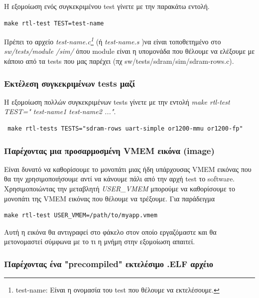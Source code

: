\documentclass[a4paper,10pt]{article}
\numberwithin{figure}{section}
\numberwithin{table}{section}
\begin{document}
Η εξομοίωση ενός συγκεκριμένου test γίνετε με την παρακάτω εντολή.
\vspace{0.7cm}
\begin{lstlisting}
make rtl-test TEST=test-name
\end{lstlisting}
\vspace{0.7cm}
Πρέπει το αρχείο \emph{test-name.c\footnote{test-name: Είναι η ονομασία του test που θέλουμε να εκτελέσουμε.}}
 (ή \emph{test-name.s} )να είναι τοποθετημένο στο \emph{sw/tests/module /sim/ } όπου module είναι η υπομονάδα που θέλουμε να ελέξουμε με κάποιο από τα tests που μας παρέχει 
(πχ sw/tests/sdram/sim/sdram-rows.c).


\subsubsection{Εκτέλεση συγκεκριμένων tests μαζί}


Η εξομοίωση πολλών συγκεκριμένων tests γίνετε με την εντολή \emph{make rtl-test TEST=" test-name1 test-name2 ..."}.
\vspace{0.7cm}
\begin{lstlisting}
 make rtl-tests TESTS="sdram-rows uart-simple or1200-mmu or1200-fp"
\end{lstlisting}
\vspace{0.7cm}


\subsubsection{ Παρέχοντας μια προσαρμοσμένη VMEM εικόνα (image)}


Είναι δυνατό να καθορίσουμε το μονοπάτι μιας ήδη υπάρχουσας VMEM εικόνας που θα την
χρησιμοποιήσουμε αντί να κάνουμε πάλι από την αρχή test το software. Χρησιμοποιώντας
την μεταβλητή \emph{USER\_VMEM} μπορούμε να καθορίσουμε το μονοπάτι της VMEM εικόνας
που θέλουμε να τρέξουμε. Για παράδειγμα 
\vspace{0.7cm}
\begin{lstlisting}
make rtl-test USER_VMEM=/path/to/myapp.vmem
\end{lstlisting}
\vspace{0.7cm}
Αυτή η εικόνα θα αντιγραφεί στο φάκελο στον οποίο εργαζόμαστε και θα μετονομαστεί
σύμφωνα με το τι η μνήμη στην εξομοίωση απαιτεί.


\subsubsection{ Παρέχοντας ένα "precompiled" εκτελέσιμο .ELF αρχέιο}
\end{document}
